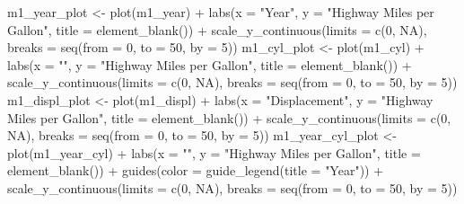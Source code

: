 \documentclass[
  11pt,
  a4paper,
  twoside]{scrbook}
\newenvironment{Shaded}{\begin{snugshade}}{\end{snugshade}}
\newcommand{\AttributeTok}[1]{\textcolor[rgb]{0.77,0.63,0.00}{#1}}
\newcommand{\ConstantTok}[1]{\textcolor[rgb]{0.00,0.00,0.00}{#1}}
\newcommand{\DecValTok}[1]{\textcolor[rgb]{0.00,0.00,0.81}{#1}}
\newcommand{\FunctionTok}[1]{\textcolor[rgb]{0.00,0.00,0.00}{#1}}
\newcommand{\NormalTok}[1]{#1}
\newcommand{\OtherTok}[1]{\textcolor[rgb]{0.56,0.35,0.01}{#1}}
\newcommand{\SpecialCharTok}[1]{\textcolor[rgb]{0.00,0.00,0.00}{#1}}
\newcommand{\StringTok}[1]{\textcolor[rgb]{0.31,0.60,0.02}{#1}}
\begin{document}
\begin{Shaded}
\begin{Highlighting}[]
\NormalTok{m1\_year\_plot }\OtherTok{\textless{}{-}} \FunctionTok{plot}\NormalTok{(m1\_year) }\SpecialCharTok{+} \FunctionTok{labs}\NormalTok{(}\AttributeTok{x =} \StringTok{"Year"}\NormalTok{, }
    \AttributeTok{y =} \StringTok{"Highway Miles per Gallon"}\NormalTok{, }\AttributeTok{title =} \FunctionTok{element\_blank}\NormalTok{()) }\SpecialCharTok{+} 
    \FunctionTok{scale\_y\_continuous}\NormalTok{(}\AttributeTok{limits =} \FunctionTok{c}\NormalTok{(}\DecValTok{0}\NormalTok{, }\ConstantTok{NA}\NormalTok{), }
                       \AttributeTok{breaks =} \FunctionTok{seq}\NormalTok{(}\AttributeTok{from =} \DecValTok{0}\NormalTok{, }\AttributeTok{to =} \DecValTok{50}\NormalTok{, }\AttributeTok{by =} \DecValTok{5}\NormalTok{))}
\NormalTok{m1\_cyl\_plot }\OtherTok{\textless{}{-}} \FunctionTok{plot}\NormalTok{(m1\_cyl) }\SpecialCharTok{+} \FunctionTok{labs}\NormalTok{(}\AttributeTok{x =} \StringTok{""}\NormalTok{, }
    \AttributeTok{y =} \StringTok{"Highway Miles per Gallon"}\NormalTok{, }\AttributeTok{title =} \FunctionTok{element\_blank}\NormalTok{()) }\SpecialCharTok{+} 
    \FunctionTok{scale\_y\_continuous}\NormalTok{(}\AttributeTok{limits =} \FunctionTok{c}\NormalTok{(}\DecValTok{0}\NormalTok{, }\ConstantTok{NA}\NormalTok{), }
                       \AttributeTok{breaks =} \FunctionTok{seq}\NormalTok{(}\AttributeTok{from =} \DecValTok{0}\NormalTok{, }\AttributeTok{to =} \DecValTok{50}\NormalTok{, }\AttributeTok{by =} \DecValTok{5}\NormalTok{))}
\NormalTok{m1\_displ\_plot }\OtherTok{\textless{}{-}} \FunctionTok{plot}\NormalTok{(m1\_displ) }\SpecialCharTok{+} \FunctionTok{labs}\NormalTok{(}\AttributeTok{x =} \StringTok{"Displacement"}\NormalTok{, }
    \AttributeTok{y =} \StringTok{"Highway Miles per Gallon"}\NormalTok{, }\AttributeTok{title =} \FunctionTok{element\_blank}\NormalTok{()) }\SpecialCharTok{+} 
    \FunctionTok{scale\_y\_continuous}\NormalTok{(}\AttributeTok{limits =} \FunctionTok{c}\NormalTok{(}\DecValTok{0}\NormalTok{, }\ConstantTok{NA}\NormalTok{), }
                       \AttributeTok{breaks =} \FunctionTok{seq}\NormalTok{(}\AttributeTok{from =} \DecValTok{0}\NormalTok{, }\AttributeTok{to =} \DecValTok{50}\NormalTok{, }\AttributeTok{by =} \DecValTok{5}\NormalTok{))}
\NormalTok{m1\_year\_cyl\_plot }\OtherTok{\textless{}{-}} \FunctionTok{plot}\NormalTok{(m1\_year\_cyl) }\SpecialCharTok{+} \FunctionTok{labs}\NormalTok{(}\AttributeTok{x =} \StringTok{""}\NormalTok{, }
    \AttributeTok{y =} \StringTok{"Highway Miles per Gallon"}\NormalTok{, }\AttributeTok{title =} \FunctionTok{element\_blank}\NormalTok{()) }\SpecialCharTok{+} 
    \FunctionTok{guides}\NormalTok{(}\AttributeTok{color =} \FunctionTok{guide\_legend}\NormalTok{(}\AttributeTok{title =} \StringTok{"Year"}\NormalTok{)) }\SpecialCharTok{+} 
    \FunctionTok{scale\_y\_continuous}\NormalTok{(}\AttributeTok{limits =} \FunctionTok{c}\NormalTok{(}\DecValTok{0}\NormalTok{, }\ConstantTok{NA}\NormalTok{), }
                       \AttributeTok{breaks =} \FunctionTok{seq}\NormalTok{(}\AttributeTok{from =} \DecValTok{0}\NormalTok{, }\AttributeTok{to =} \DecValTok{50}\NormalTok{, }\AttributeTok{by =} \DecValTok{5}\NormalTok{))}


\end{Highlighting}
\end{Shaded}
\end{document}
